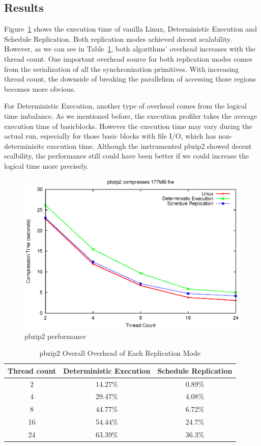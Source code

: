 \subsection{Results}

Figure~\ref{f:pbzip_b10_performance} shows the execution time of vanilla Linux, Deterministic Execution and Schedule Replication. Both replication modes achieved decent scalability. However, as we can see in Table~\ref{t:pbzip2_overall}, both algorithms' overhead increases with the thread count. One important overhead source for both replication modes comes from the serialization of all the synchronization primitives. With increasing thread count, the downside of breaking the parallelism of accessing those regions becomes more obvious.

For Deterministic Execution, another type of overhead comes from the logical time imbalance. As we mentioned before, the execution profiler takes the average execution time of basicblocks. However the execution time may vary during the actual run, especially for those basic blocks with file I/O, which has non-determinisitc execution time. Although the instrumented pbzip2 showed decent scalbility, the performance still could have been better if we could increase the logical time more precisely.

\begin{figure}
\centering
\includegraphics[width=0.8\columnwidth]{figures/pbzip2_b10}
\caption{pbzip2 performance}
\label{f:pbzip_b10_performance}
\end{figure}

\begin{table}
\caption{pbzip2 Overall Overhead of Each Replication Mode}
\begin{center}
 \begin{tabular}{c | c | c}
Thread count & Deterministic Execution & Schedule Replication \\ \hline
 2 & 14.27\% & 0.89\% \\ \hline
 4 & 29.47\% & 4.08\% \\ \hline
 8 & 44.77\% & 6.72\% \\ \hline
 16 & 54.44\% & 24.7\% \\ \hline
 24 & 63.39\% & 36.3\% \\ \hline 
 \end{tabular}
\end{center}
\label{t:pbzip2_overall}
\end{table}

